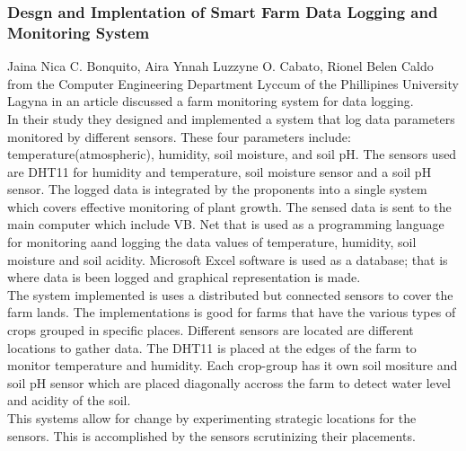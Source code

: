 \documentclass[12pt, a4paper]{article}
\begin{document}
\subsubsection{Desgn and Implentation of Smart Farm Data Logging and Monitoring System}
Jaina Nica C. Bonquito, Aira Ynnah Luzzyne O. Cabato, Rionel Belen Caldo from the Computer Engineering Department Lyccum of the Phillipines University Lagyna in an article discussed a farm monitoring system for data logging.\\
In their study they designed and implemented a system that log data parameters monitored by different sensors. These four parameters include: temperature(atmospheric), humidity, soil moisture, and soil pH. The sensors used are DHT11 for humidity and temperature, soil moisture sensor and a soil pH sensor. The logged data is integrated by the proponents into a single system which covers effective monitoring of plant growth. The sensed data is sent to the main computer which include VB. Net that is used as a programming language for monitoring aand logging the data values of temperature, humidity,  soil moisture and soil acidity. Microsoft Excel software is used as a database; that is where data is been logged and graphical representation is made.\\
The system implemented is uses a distributed but connected sensors to cover the farm lands. The implementations is good for farms that have the various types of crops grouped in specific places. Different sensors are located are different locations to gather data. The DHT11 is placed at the edges of the farm to monitor temperature and humidity. Each crop-group has it own soil mositure and soil pH sensor which are placed diagonally accross the farm to detect water level and acidity of the soil.\\
This systems allow for change by experimenting strategic locations for the sensors. This is accomplished by the sensors scrutinizing their placements.   
\end{document}
